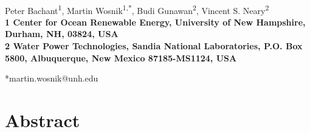 \documentclass[10pt,letterpaper]{article}
\date{}
\begin{document}
\linenumbers
\vspace*{0.35in}

\begin{flushleft}

{\Large \textbf{}} \newline %
\\ Peter Bachant\textsuperscript{1}, Martin Wosnik\textsuperscript{1,*}, Budi
Gunawan\textsuperscript{2}, Vincent S. Neary\textsuperscript{2} \\ \bigskip
\bf{1} Center for Ocean Renewable Energy, University of New Hampshire, Durham,
NH, 03824, USA \\ \bf{2} Water Power Technologies, Sandia National Laboratories,
P.O. Box 5800, Albuquerque, New Mexico 87185-MS1124, USA \\ \bigskip

*martin.wosnik@unh.edu

\end{flushleft}

\section*{Abstract}
\end{document}
